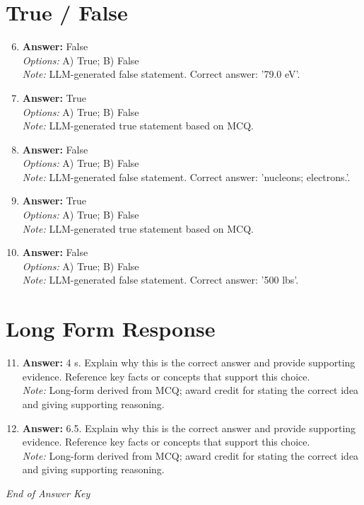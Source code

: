 \documentclass[12pt]{article}
\begin{document}
\section*{True / False}
\begin{enumerate}[label=\arabic*.]
\setcounter{enumi}{5}
\item \textbf{Answer:} False
\\ \textit{Options:} A) True; B) False
\\ \textit{Note:} LLM-generated false statement. Correct answer: '79.0 eV'.
\item \textbf{Answer:} True
\\ \textit{Options:} A) True; B) False
\\ \textit{Note:} LLM-generated true statement based on MCQ.
\item \textbf{Answer:} False
\\ \textit{Options:} A) True; B) False
\\ \textit{Note:} LLM-generated false statement. Correct answer: 'nucleons; electrons.'.
\item \textbf{Answer:} True
\\ \textit{Options:} A) True; B) False
\\ \textit{Note:} LLM-generated true statement based on MCQ.
\item \textbf{Answer:} False
\\ \textit{Options:} A) True; B) False
\\ \textit{Note:} LLM-generated false statement. Correct answer: '500 lbs'.
\end{enumerate}

\section*{Long Form Response}
\begin{enumerate}[label=\arabic*.]
\setcounter{enumi}{10}
\item \textbf{Answer:} 4 s. Explain why this is the correct answer and provide supporting evidence. Reference key facts or concepts that support this choice.
\\ \textit{Note:} Long-form derived from MCQ; award credit for stating the correct idea and giving supporting reasoning.
\item \textbf{Answer:} 6.5. Explain why this is the correct answer and provide supporting evidence. Reference key facts or concepts that support this choice.
\\ \textit{Note:} Long-form derived from MCQ; award credit for stating the correct idea and giving supporting reasoning.
\end{enumerate}

\vfill
\noindent\textit{End of Answer Key}
\end{document}

